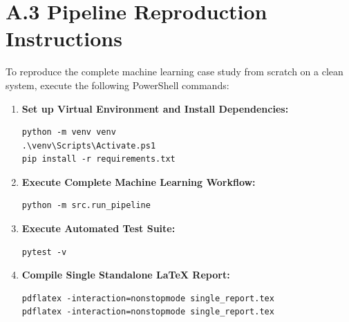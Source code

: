 \documentclass[12pt,a4paper]{report}
\begin{document}
\section*{A.3 Pipeline Reproduction Instructions}
To reproduce the complete machine learning case study from scratch on a clean system, execute the following PowerShell commands:

\begin{enumerate}
    \item \textbf{Set up Virtual Environment and Install Dependencies:}
\begin{verbatim}
python -m venv venv
.\venv\Scripts\Activate.ps1
pip install -r requirements.txt
\end{verbatim}

    \item \textbf{Execute Complete Machine Learning Workflow:}
\begin{verbatim}
python -m src.run_pipeline
\end{verbatim}

    \item \textbf{Execute Automated Test Suite:}
\begin{verbatim}
pytest -v
\end{verbatim}

    \item \textbf{Compile Single Standalone LaTeX Report:}
\begin{verbatim}
pdflatex -interaction=nonstopmode single_report.tex
pdflatex -interaction=nonstopmode single_report.tex
\end{verbatim}
\end{enumerate}
\end{document}
